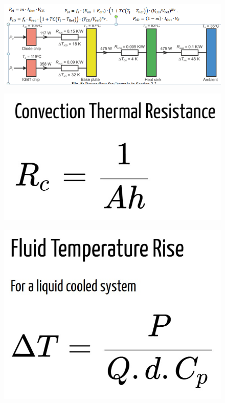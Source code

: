\documentclass[twocolumn, ]{article}
\begin{document}
\begin{figure}
	\includegraphics[scale=0.65]{heat}
\end{figure}

\begin{figure}
	\includegraphics[scale=0.65]{Convection.jpg}
\end{figure}

\begin{figure}
	\includegraphics[scale=0.65]{Fluid.jpg}
\end{figure}
\end{document}
